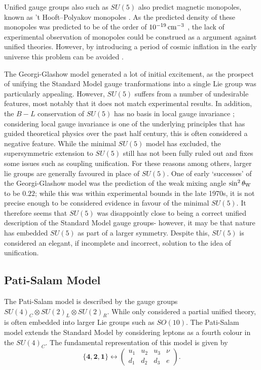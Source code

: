 \documentclass{article}
\begin{document}
Unified gauge groups also such as $SU(5)$ also predict magnetic monopoles, known as 't Hooft–Polyakov monopoles \cite{GUTMonopoles}. As the predicted density of these monopoles was predicted to be of the order of $10^{-19}\,\rm{cm}^{-3}$ \cite{GUTMonopoleDensity}, the lack of experimental observation of monopoles could be construed as a argument against unified theories. However, by introducing a period of cosmic inflation in the early universe this problem can be avoided \cite{InflationMonopole}.

The Georgi-Glashow model generated a lot of initial excitement, as the prospect of unifying the Standard Model gauge tranformations into a single Lie group was particularly appealing. However, $SU(5)$ suffers from a number of undesirable features, most notably that it does not match experimental results.
In addition, the $B-L$ conservation of $SU(5)$ has no basis in local gauge invariance \cite{GUTBaryonAsym}; considering local gauge invariance is one of the underlying principles that has guided theoretical physics over the past half century, this is often considered a negative feature. 
While the minimal $SU(5)$ model has excluded, the supersymmetric extension to $SU(5)$ still has not been fully ruled out and fixes some issues such as coupling unification. For these reasons among others, larger lie groups are generally favoured in place of $SU(5)$.
One of early `successes' of the Georgi-Glashow model was the prediction of the weak mixing angle $\sin^2\theta_{\rm{W}}$  to be $0.22$\cite{SU5WeakMixing}; while this was within experimental bounds in the late 1970s, it is not precise enough to be considered evidence in favour of the minimal $SU(5)$. It therefore seems that $SU(5)$ was disappointly close to being a correct unified description of the Standard Model gauge groups- however, it may be that nature has embedded $SU(5)$ as part of a larger symmetry. Despite this, $SU(5)$ is considered an elegant, if incomplete and incorrect, solution to the idea of unification.

\subsection{Pati-Salam Model}%
\label{sec:GUT_PS}
The Pati-Salam model \cite{PatiSalam} is described by the gauge groups $SU(4)_C\otimes SU(2)_L\otimes SU(2)_R$. While only considered a partial unified theory, is often embedded into larger Lie groups such as $SO(10)$. The Pati-Salam model extends the Standard Model by considering leptons as a fourth colour in the $SU(4)_C$. The fundamental representation of this model is given by
\begin{equation}
\{\bm{4},\bm{2},\bm{1}\} \leftrightarrow 
\left(\begin{matrix}
u_1 & u_2 & u_3 & \nu \\
d_1 & d_2 & d_3 & e
\end{matrix}\right).
\end{equation}
\end{document}
